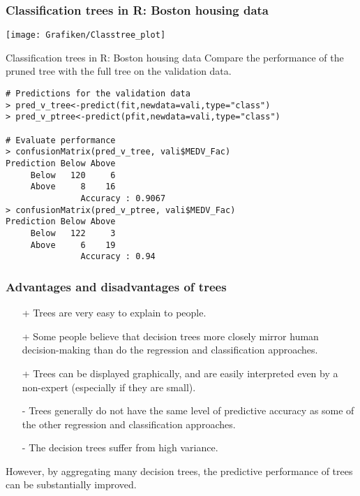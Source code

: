 \documentclass{beamer}
\begin{document}
\begin{frame}
\frametitle{Classification trees in R: Boston housing data}
\begin{center}
\texttt{[image: Grafiken/Classtree\_plot]}
\end{center}
\end{frame}

\begin{frame}[fragile]{Classification trees in R: Boston housing data}
Compare the performance of the pruned tree with the full tree on the validation data.
\begin{lstlisting}
# Predictions for the validation data
> pred_v_tree<-predict(fit,newdata=vali,type="class")
> pred_v_ptree<-predict(pfit,newdata=vali,type="class")

# Evaluate performance
> confusionMatrix(pred_v_tree, vali$MEDV_Fac)
Prediction Below Above
     Below   120     6
     Above     8    16
               Accuracy : 0.9067
> confusionMatrix(pred_v_ptree, vali$MEDV_Fac)
Prediction Below Above
     Below   122     3
     Above     6    19
               Accuracy : 0.94
\end{lstlisting}
\end{frame}

\begin{frame}\frametitle{Advantages and disadvantages of trees}
\begin{itemize}
\item[+] Trees are very easy to explain to people.
\vspace*{0.2cm}
\item[+] Some people believe that decision trees more closely mirror
human decision-making than do the regression and
classification approaches.
\vspace*{0.2cm}
\item[+] Trees can be displayed graphically, and are easily
interpreted even by a non-expert (especially if they are
small).
\vspace*{0.2cm}
\item[-] Trees generally do not have the same level of
predictive accuracy as some of the other regression and
classification approaches.
\vspace*{0.2cm}
\item[-] The decision trees suffer from high variance.
\end{itemize}
\vspace*{0.2cm}
However, by aggregating many decision trees, the predictive
performance of trees can be substantially improved.
\end{frame}
\end{document}
